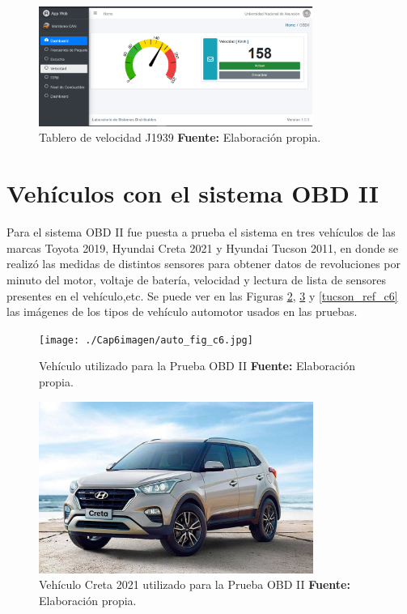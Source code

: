 \begin{figure}[H]
	\centering
	\includegraphics[width=0.8\textwidth]{./Cap6imagen/gauge_fig_c6.png}
	\caption [Tablero de Velocidad J1939.]{Tablero de velocidad J1939 \textbf{ Fuente:} %
		Elaboración propia.}
	\label{gauge_ref_c6} %
\end{figure}

\section{Vehículos con el sistema OBD II}

Para el sistema OBD II fue puesta a prueba el sistema en tres vehículos de las marcas Toyota 2019, Hyundai Creta 2021 y Hyundai Tucson 2011, en donde se realizó las medidas de distintos sensores para obtener datos de revoluciones por minuto del motor, voltaje de batería, velocidad y lectura de lista de sensores presentes en el vehículo,etc. 
Se puede ver en las Figuras \ref{auto_ref_c6}, \ref{creta_ref_c6} y \ref{tucson_ref_c6}  las imágenes de los tipos de vehículo automotor usados en las pruebas. 

\begin{figure}[H]
	\centering
	\texttt{[image: ./Cap6imagen/auto\_fig\_c6.jpg]}
	\caption [Vehículo utilizado para la Prueba OBD II.]{Vehículo utilizado para la Prueba OBD II \textbf{ Fuente:} %
		Elaboración propia.}
	\label{auto_ref_c6} %
\end{figure}

\begin{figure}[H]
	\centering
	\includegraphics[width=0.8\textwidth]{./Cap6imagen/creta_fig_c6.jpg}
	\caption [Vehículo Creta 2021 utilizado para la Prueba OBD II.]{Vehículo Creta 2021 utilizado para la Prueba OBD II \textbf{ Fuente:} %
		Elaboración propia.}
	\label{creta_ref_c6} %
\end{figure}

